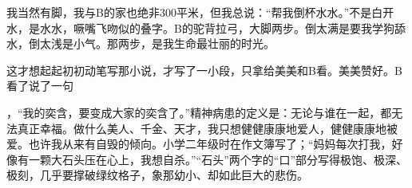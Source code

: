 \documentclass{article}
\begin{document}
我当然有脚，我与B的家也绝非300平米，但我总说：“帮我倒杯水水。”不是白开水，是水水，噘嘴飞吻似的叠字。B的驼背拉弓，大脚两步。倒太满是要我学狗舔水，倒太浅是小气。那两步，是我生命最壮丽的时光。

这才想起起初初动笔写那小说，才写了一小段，只拿给美美和B看。美美赞好。B看了说了一句

\newpage 

，“我的奕含，要变成大家的奕含了。”精神病患的定义是：无论与谁在一起，都无法真正幸福。做什么美人、千金、天才，我只想健健康康地爱人，健健康康地被爱。也许我从来有自毁的倾向。小学二年级时在作文簿写了；“妈妈每次打我，好像有一颗大石头压在心上，我想自杀。”“石头”两个字的“口”部分写得极饱、极深、极刻，几乎要撑破绿纹格子，象那幼小、却如此巨大的悲伤。
\end{document}
